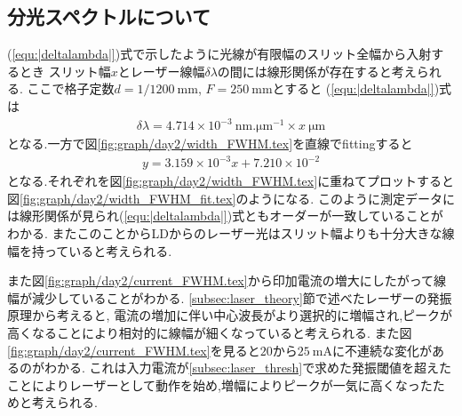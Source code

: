 \subsection{分光スペクトルについて}
(\ref{equ:|deltalambda|})式で示したように光線が有限幅のスリット全幅から入射するとき
スリット幅$x$とレーザー線幅$\delta\lambda$の間には線形関係が存在すると考えられる.
ここで格子定数$d=1/1200\ \si{\milli\metre}$, $F=250\ \si{\milli\metre}$とすると
(\ref{equ:|deltalambda|})式は
\begin{align}
  \delta\lambda=4.714\times10^{-3}\ \si{\nano\metre.\micro\metre^{-1}}\times x\ \si{\micro\metre}
\end{align}
となる.一方で図\ref{fig:graph/day2/width_FWHM.tex}を直線でfittingすると
\begin{align}
  y=3.159\times10^{-3}x+7.210\times10^{-2}
\end{align}
となる.それぞれを図\ref{fig:graph/day2/width_FWHM.tex}に重ねてプロットすると図\ref{fig:graph/day2/width_FWHM_fit.tex}のようになる.
このように測定データには線形関係が見られ(\ref{equ:|deltalambda|})式ともオーダーが一致していることがわかる.
またこのことからLDからのレーザー光はスリット幅よりも十分大きな線幅を持っていると考えられる.
\clearpage

また図\ref{fig:graph/day2/current_FWHM.tex}から印加電流の増大にしたがって線幅が減少していることがわかる.
\ref{subsec:laser_theory}節で述べたレーザーの発振原理から考えると,
電流の増加に伴い中心波長がより選択的に増幅され,ピークが高くなることにより相対的に線幅が細くなっていると考えられる.
また図\ref{fig:graph/day2/current_FWHM.tex}を見ると$20$から$25\ \si{\milli\ampere}$に不連続な変化があるのがわかる.
これは入力電流が\ref{subsec:laser_thresh}で求めた発振閾値を超えたことによりレーザーとして動作を始め,増幅によりピークが一気に高くなったためと考えられる.